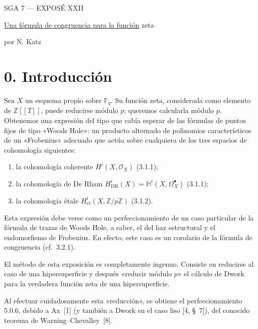 \pageoriginale

\clearpage
{}
\begin{center}
{\large SGA 7 --- EXPOSÉ XXII}\par
\vspace{2em}
{\Large\underline{Una fórmula de congruencia para la función} zeta}\par
\vspace{1.5em}
{\large por N. Katz}\par
\end{center}

\section*{0. Introducción}

Sea $X$ un esquema propio sobre $\mathbb F_q$. Su función zeta,
considerada como elemento de $\mathbb Z[[T]]$, puede reducirse módulo $p$;
queremos calcularla módulo $p$. Obtenemos una expresión del tipo que cabía
esperar de las fórmulas de puntos fijos de tipo «Woods Hole»: un producto
alternado de polinomios característicos de un «Frobenius» adecuado que
actúa sobre cualquiera de los tres espacios de cohomología siguientes:

\begin{enumerate}[label=\arabic*)]
\item la cohomología coherente $H^i(X,\mathcal O_X)$ (3.1.1);
\item la cohomología de De Rham
  $H^i_{\mathrm{DR}}(X)=\mathbb H^i(X,\Omega_X^\bullet)$ (3.1.1);
\item la cohomología étale $H^i_{\mathrm{et}}(X,\mathbb Z/p\mathbb Z)$
  (3.1.2).
\end{enumerate}

Esta expresión debe verse como un perfeccionamiento de un caso particular
de la fórmula de trazas de Woods Hole, a saber, el del haz estructural y el
endomorfismo de Frobenius. En efecto, este caso es un corolario de la
fórmula de congruencia (cf.~3.2.1).

El método de esta exposición es completamente ingenuo. Consiste en reducirse al
caso de una hipersuperficie y después «reducir módulo $p$» el cálculo de
Dwork para la verdadera función zeta de una hipersuperficie.

\pageoriginale

Al efectuar cuidadosamente esta «reducción», se obtiene el
perfeccionamiento 5.0.6, debido a Ax~[1] (y también a Dwork en el caso liso
[4, \S~7]), del conocido teorema de Warning--Chevalley~[8].

